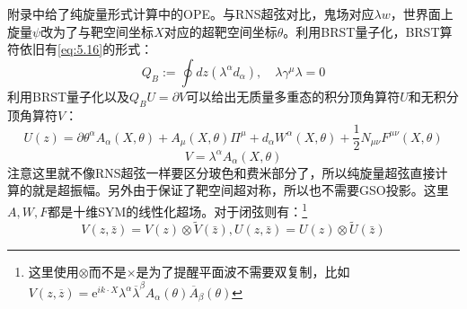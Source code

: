 附录中给了纯旋量形式计算中的OPE。与RNS超弦对比，鬼场对应$\lambda w$，世界面上旋量$\psi$改为了与靶空间坐标$X$对应的超靶空间坐标$\theta$。利用BRST量子化，BRST算符依旧有\ref{eq:5.16}的形式：
\begin{equation}
	Q_B:=\oint dz\left(\lambda^\alpha d_\alpha\right),\quad \lambda\gamma^\mu\lambda=0
\end{equation}
利用BRST量子化以及$Q_B U = \partial V$可以给出无质量多重态的积分顶角算符$U$和无积分顶角算符$V$：
\begin{equation}
	\label{eq:5.39}
	U(z)=\partial\theta^\alpha A_\alpha(X,\theta)+A_\mu(X,\theta)\Pi^\mu+d_\alpha W^\alpha(X,\theta)+\frac{1}{2}N_{\mu\nu}F^{\mu\nu}(X,\theta)
\end{equation}
\begin{equation}
	\label{eq:5.40}
	V=\lambda^\alpha A_\alpha(X,\theta)
\end{equation}
注意这里就不像RNS超弦一样要区分玻色和费米部分了，所以纯旋量超弦直接计算的就是超振幅。另外由于保证了靶空间超对称，所以也不需要GSO投影。这里$A,W,F$都是十维SYM的线性化超场。对于闭弦则有：\footnote{这里使用$\otimes$而不是$\times$是为了提醒平面波不需要双复制，比如$V(z,\overline{z})=\mathrm{e}^{ik\cdot X}\lambda^\alpha\overline{\lambda}^\beta A_\alpha(\theta)\overline{A}_\beta(\theta)$}
\begin{equation}
	V(z,\bar z) = V(z)\otimes \tilde V(\bar z), U(z,\bar z) = U(z)\otimes \tilde U(\bar z)
\end{equation}


